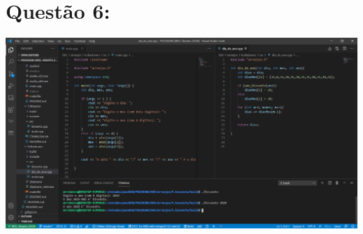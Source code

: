 \documentclass{article}
\begin{document}
\section*{Questão 6:}

\includegraphics[scale=0.4]{06.DiaDoAno.png}
\end{document}
